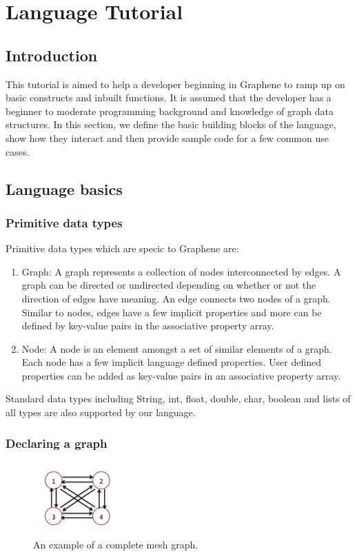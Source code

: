 \documentclass[a4paper]{article}
\begin{document}
\clearpage
\section{Language Tutorial}
\subsection{Introduction}

This tutorial is aimed to help a developer beginning in Graphene to ramp up on basic constructs and inbuilt functions. It is assumed that the developer has a beginner to moderate programming background and knowledge of graph data structures. In this section, we define the basic building blocks of the language, show how they interact and then provide sample code for a few common use cases.

\subsection{Language basics}

\subsubsection{Primitive data types}
\noindent Primitive data types which are specic to Graphene are:

\begin{enumerate}
\item Graph: A graph represents a collection of nodes interconnected by edges. A graph can be directed or undirected depending on whether or not the direction of edges have meaning. An edge connects two nodes of a graph. Similar to nodes, edges have a few implicit properties and more can be defined by key-value pairs in the associative property array.
\item Node: A node is an element amongst a set of similar elements of a graph. Each node has a few implicit language defined properties. User defined properties can be added as key-value pairs in an associative property array.
\end{enumerate}
\noindent Standard data types including String, int, float, double, char, boolean and lists of all types are also supported by our language.

\subsubsection{Declaring a graph}

\begin{figure}[ht]
\centering
\includegraphics[width=0.3\textwidth]{mesh.png}
\caption{An example of a complete mesh graph.}
\end{figure}
\end{document}
